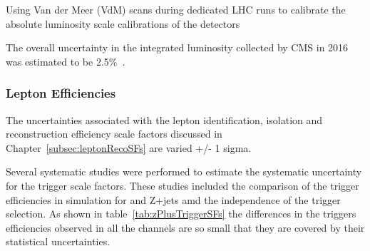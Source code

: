 Using Van der Meer (VdM) scans during dedicated LHC runs to calibrate the absolute luminosity scale calibrations of the detectors~\cite{vanderMeer:1968zz}


The overall uncertainty in the integrated luminosity collected by CMS in 2016 was estimated to be 2.5\%~\cite{CMS:2017_lumi}.


\subsubsection{Lepton Efficiencies}
The uncertainties associated with the lepton identification, isolation and reconstruction efficiency scale factors discussed in Chapter~\ref{subsec:leptonRecoSFs} are varied +/- 1 sigma.

Several systematic studies were performed to estimate the systematic uncertainty for the trigger scale factors.
These studies included the comparison of the trigger efficiencies in simulation for \ttbar and Z+jets amd the independence of the \MET trigger selection.
As shown in table~\ref{tab:zPlusTriggerSFs} the differences in the triggers efficiencies observed in all the  channels are so small that they are covered by their statistical uncertainties.

\begin{table}[htbp]
\label{tab:zPlusTriggerSFs}
  \centering
\end{table}

